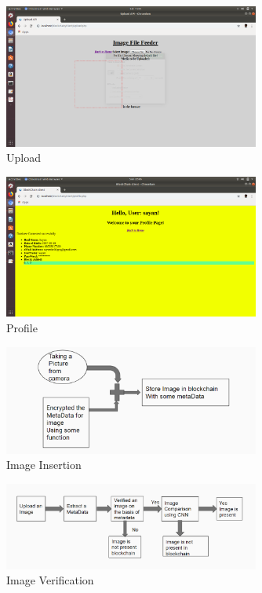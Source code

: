 \begin{figure}
\begin{center}
\includegraphics[width=0.75\textwidth]{./img_src/screen4.png}
\end{center}
\caption{Upload}
\label{fig:img_upload}
\end{figure}

\begin{figure}
\begin{center}
\includegraphics[width=0.75\textwidth]{./img_src/screen5.png}
\end{center}
\caption{Profile}
\label{fig:profile}
\end{figure}

\begin{figure}
\begin{center}
\includegraphics[width=0.75\textwidth]{./img_src/upload.png}
\end{center}
\caption{Image Insertion}
\label{fig:upload}
\end{figure}

\begin{figure}
\begin{center}
\includegraphics[width=0.75\textwidth]{./img_src/verify.png}
\end{center}
\caption{Image Verification}
\label{fig:verify}
\end{figure}
